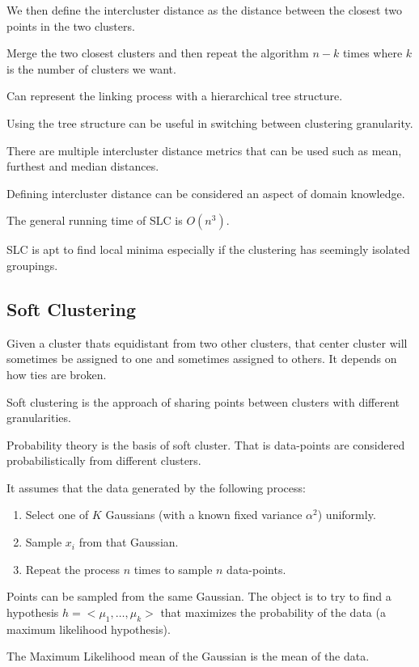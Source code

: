 \documentclass{article}
\begin{document}
We then define the intercluster distance as the distance between the closest two
points in the two clusters. 

Merge the two closest clusters and then repeat the algorithm $n - k$ times
where $k$ is the number of clusters we want. 

Can represent the linking process with a hierarchical tree structure. 

Using the tree structure can be useful in switching between clustering 
granularity. 

There are multiple intercluster distance metrics that can be used such as 
mean, furthest and median distances. 

Defining intercluster distance can be considered an aspect of domain knowledge. 

The general running time of SLC is $O(n^3)$. 

SLC is apt to find local minima especially if the clustering has seemingly
isolated groupings. 

\subsection{Soft Clustering}
Given a cluster thats equidistant from two other clusters, that center cluster
will sometimes be assigned to one and sometimes assigned to others. It depends 
on how ties are broken. 

Soft clustering is the approach of sharing points between clusters with
different granularities. 

Probability theory is the basis of soft cluster. That is data-points are
considered probabilistically from different clusters.

It assumes that the data generated by the following process:
\begin{enumerate}
	\item Select one of $K$ Gaussians (with a known fixed variance
		$\alpha^2$) uniformly.
	\item Sample $x_i$ from that Gaussian.
	\item Repeat the process $n$ times to sample $n$ data-points.
\end{enumerate}

Points can be sampled from the same Gaussian. 
The object is to try to find a hypothesis $h = <\mu_1, \ldots ,\mu_k>$ that
maximizes the probability of the data (a maximum likelihood hypothesis). 

The Maximum Likelihood mean of the Gaussian is the mean of the data. 
\end{document}
